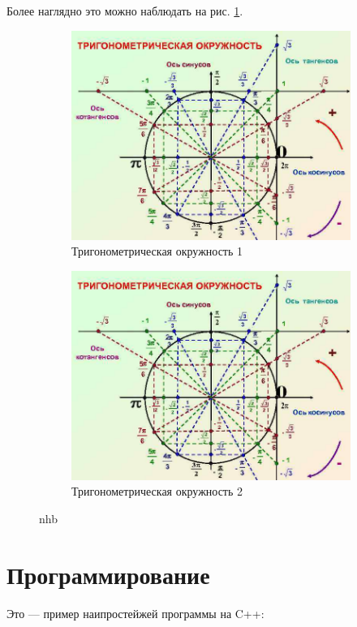 \documentclass[120.214pt]{article}%
\begin{document}
Более наглядно это можно наблюдать на рис. \ref{pic_trig1}.

\begin{figure}[h!]
	\begin{subfigure}{.5\linewidth}
		\centering
		\includegraphics[width=0.7\linewidth]{trigcirc}
		\caption{Тригонометрическая окружность 1}
		\label{pic_trig1}
	\end{subfigure}
	\begin{subfigure}{.5\linewidth}
		\centering
		\includegraphics[width=0.7\linewidth]{trigcirc}
		\caption{Тригонометрическая окружность 2}
		\label{pic_trig2}
	\end{subfigure}
\caption{nhb}
\end{figure}

\newpage

\section{Программирование}

Это --- пример наипростейжей программы на C++:

%
\end{document}
